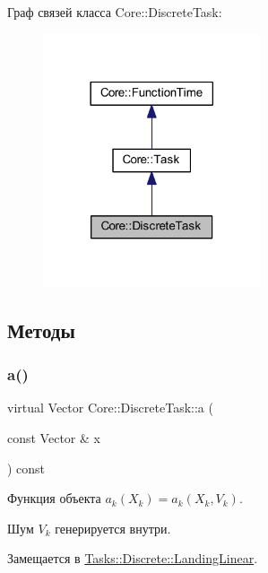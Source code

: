 Граф связей класса Core\+:\+:Discrete\+Task\+:
\nopagebreak
\begin{figure}[H]
\begin{center}
\leavevmode
\includegraphics[width=182pt]{class_core_1_1_discrete_task__coll__graph}
\end{center}
\end{figure}


\subsection{Методы}
\hypertarget{class_core_1_1_discrete_task_a49d377fa365d5ec3e05962ee751f2d9e}{}\label{class_core_1_1_discrete_task_a49d377fa365d5ec3e05962ee751f2d9e} 
\subsubsection{\texorpdfstring{a()}{a()}}
{\footnotesize\ttfamily virtual Vector Core\+::\+Discrete\+Task\+::a (\begin{DoxyParamCaption}\item[{const Vector \&}]{x }\end{DoxyParamCaption}) const\hspace{0.3cm}{\ttfamily [pure virtual]}}



Функция объекта $a_k(X_k) = a_k(X_k, V_k)$. 

Шум $V_k$ генерируется внутри. 

Замещается в \hyperlink{class_tasks_1_1_discrete_1_1_landing_linear_af0c0c48603fc226055ee233f93fa21fc}{Tasks\+::\+Discrete\+::\+Landing\+Linear}.

\hypertarget{class_core_1_1_discrete_task_a82c1aa8100dd9211739f8fd9f7d52c81}{}\label{class_core_1_1_discrete_task_a82c1aa8100dd9211739f8fd9f7d52c81} 
